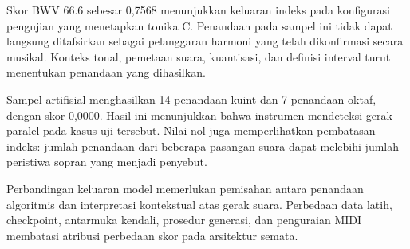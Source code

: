 Skor BWV 66.6 sebesar 0,7568 menunjukkan keluaran indeks pada konfigurasi pengujian yang menetapkan tonika C. Penandaan pada sampel ini tidak dapat langsung ditafsirkan sebagai pelanggaran harmoni yang telah dikonfirmasi secara musikal. Konteks tonal, pemetaan suara, kuantisasi, dan definisi interval turut menentukan penandaan yang dihasilkan.

Sampel artifisial menghasilkan 14 penandaan kuint dan 7 penandaan oktaf, dengan skor 0,0000. Hasil ini menunjukkan bahwa instrumen mendeteksi gerak paralel pada kasus uji tersebut. Nilai nol juga memperlihatkan pembatasan indeks: jumlah penandaan dari beberapa pasangan suara dapat melebihi jumlah peristiwa sopran yang menjadi penyebut.

Perbandingan keluaran model memerlukan pemisahan antara penandaan algoritmis dan interpretasi kontekstual atas gerak suara. Perbedaan data latih, checkpoint, antarmuka kendali, prosedur generasi, dan penguraian MIDI membatasi atribusi perbedaan skor pada arsitektur semata.
